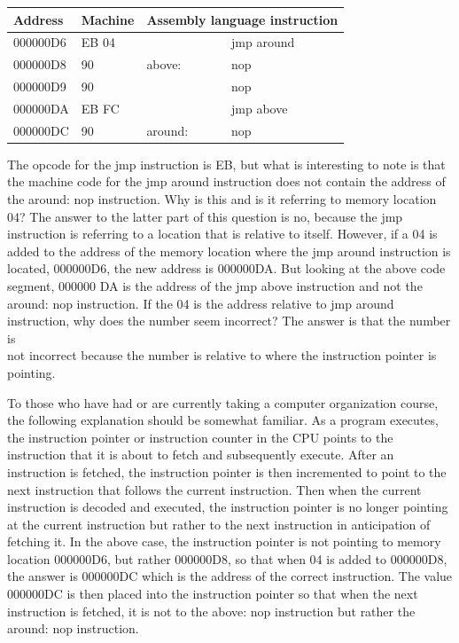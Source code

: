 \documentclass[10pt]{book}
\begin{document}
\begin{center}
\begin{tabular}{|l|l|l|l|}
\hline
Address & Machine & \multicolumn{2}{|l|}{Assembly language instruction} \\
\hline
000000D6 & EB 04 &  & jmp around \\
\hline
000000D8 & 90 & above: & nop \\
\hline
000000D9 & 90 &  & nop \\
\hline
000000DA & EB FC &  & jmp above \\
\hline
000000DC & 90 & around: & nop \\
\hline
\end{tabular}
\end{center}

The opcode for the jmp instruction is EB, but what is interesting to note is that the machine code for the jmp around instruction does not contain the address of the around: nop instruction. Why is this and is it referring to memory location 04? The answer to the latter part of this question is no, because the jmp instruction is referring to a location that is relative to itself. However, if a 04 is added to the address of the memory location where the jmp around instruction is located, 000000D6, the new address is 000000DA. But looking at the above code segment, 000000 DA is the address of the jmp above instruction and not the around: nop instruction. If the 04 is the address relative to jmp around instruction, why does the number seem incorrect? The answer is that the number is\\
not incorrect because the number is relative to where the instruction pointer is pointing.


To those who have had or are currently taking a computer organization course, the following explanation should be somewhat familiar. As a program executes, the instruction pointer or instruction counter in the CPU points to the instruction that it is about to fetch and subsequently execute. After an instruction is fetched, the instruction pointer is then incremented to point to the next instruction that follows the current instruction. Then when the current instruction is decoded and executed, the instruction pointer is no longer pointing at the current instruction but rather to the next instruction in anticipation of fetching it. In the above case, the instruction pointer is not pointing to memory location 000000D6, but rather 000000D8, so that when 04 is added to 000000D8, the answer is 000000DC which is the address of the correct instruction. The value 000000DC is then placed into the instruction pointer so that when the next instruction is fetched, it is not to the above: nop instruction but rather the around: nop instruction.
\end{document}

